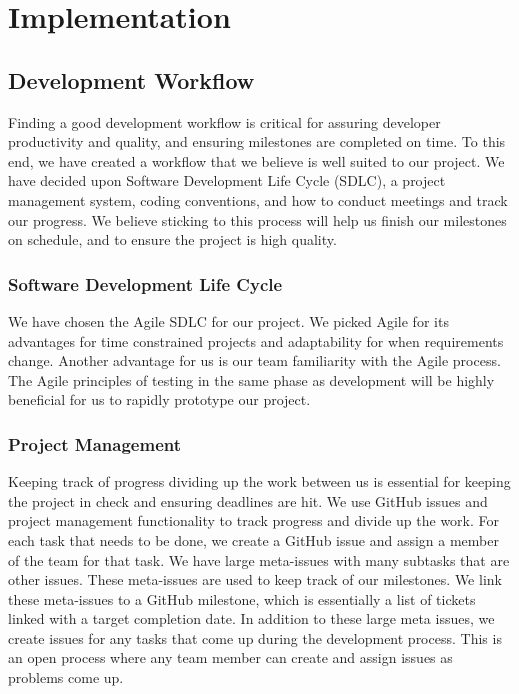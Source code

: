 \section{Implementation}

\subsection{Development Workflow}

Finding a good development workflow is critical for assuring developer productivity and
quality, and ensuring milestones are completed on time. To this end, we have created a
workflow that we believe is well suited to our project. We have decided upon Software
Development Life Cycle (SDLC), a project management system, coding conventions, and how to
conduct meetings and track our progress. We believe sticking to this process will help us
finish our milestones on schedule, and to ensure the project is high quality.

\subsubsection{Software Development Life Cycle}

We have chosen the Agile SDLC for our project. We picked Agile for its advantages for time
constrained projects and adaptability for when requirements change. Another advantage for us
is our team familiarity with the Agile process. The Agile principles of testing in the
same phase as development will be highly beneficial for us to rapidly prototype our
project.

\subsubsection{Project Management}

Keeping track of progress dividing up the work between us is essential for keeping the
project in check and ensuring deadlines are hit. We use GitHub issues and project
management functionality to track progress and divide up the work. For each task that
needs to be done, we create a GitHub issue and assign a member of the team for that task.
We have large meta-issues with many subtasks that are other issues. These meta-issues are
used to keep track of our milestones. We link these meta-issues to a GitHub milestone,
which is essentially a list of tickets linked with a target completion date. In addition
to these large meta issues, we create issues for any tasks that come up during the
development process. This is an open process where any team member can create and assign
issues as problems come up.

